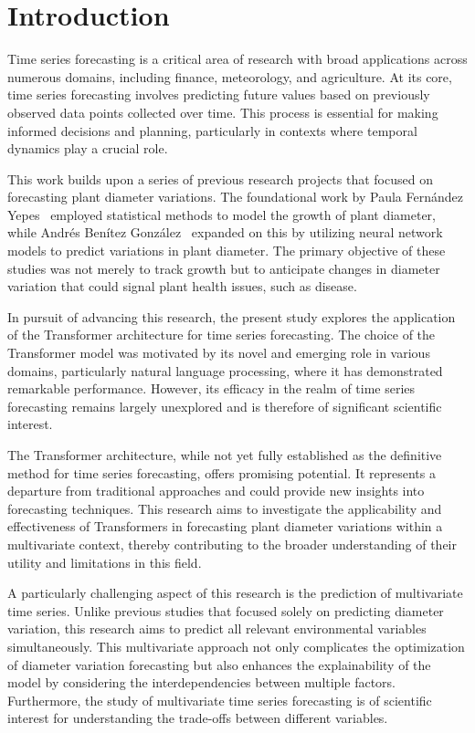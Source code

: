 \chapter{Introduction}
\pagestyle{esitscCD}

Time series forecasting is a critical area of research with broad applications across numerous domains, including finance, meteorology, and agriculture. At its core, time series forecasting involves predicting future values based on previously observed data points collected over time. This process is essential for making informed decisions and planning, particularly in contexts where temporal dynamics play a crucial role.

This work builds upon a series of previous research projects that focused on forecasting plant diameter variations. The foundational work by Paula Fernández Yepes~\cite{FernandezYepes2022} employed statistical methods to model the growth of plant diameter, while Andrés Benítez González~\cite{BenitezGonzalez2023} expanded on this by utilizing neural network models to predict variations in plant diameter. The primary objective of these studies was not merely to track growth but to anticipate changes in diameter variation that could signal plant health issues, such as disease.

In pursuit of advancing this research, the present study explores the application of the Transformer architecture for time series forecasting. The choice of the Transformer model was motivated by its novel and emerging role in various domains, particularly natural language processing, where it has demonstrated remarkable performance. However, its efficacy in the realm of time series forecasting remains largely unexplored and is therefore of significant scientific interest.

The Transformer architecture, while not yet fully established as the definitive method for time series forecasting, offers promising potential. It represents a departure from traditional approaches and could provide new insights into forecasting techniques. This research aims to investigate the applicability and effectiveness of Transformers in forecasting plant diameter variations within a multivariate context, thereby contributing to the broader understanding of their utility and limitations in this field.

A particularly challenging aspect of this research is the prediction of multivariate time series. Unlike previous studies that focused solely on predicting diameter variation, this research aims to predict all relevant environmental variables simultaneously. This multivariate approach not only complicates the optimization of diameter variation forecasting but also enhances the explainability of the model by considering the interdependencies between multiple factors. Furthermore, the study of multivariate time series forecasting is of scientific interest for understanding the trade-offs between different variables.

